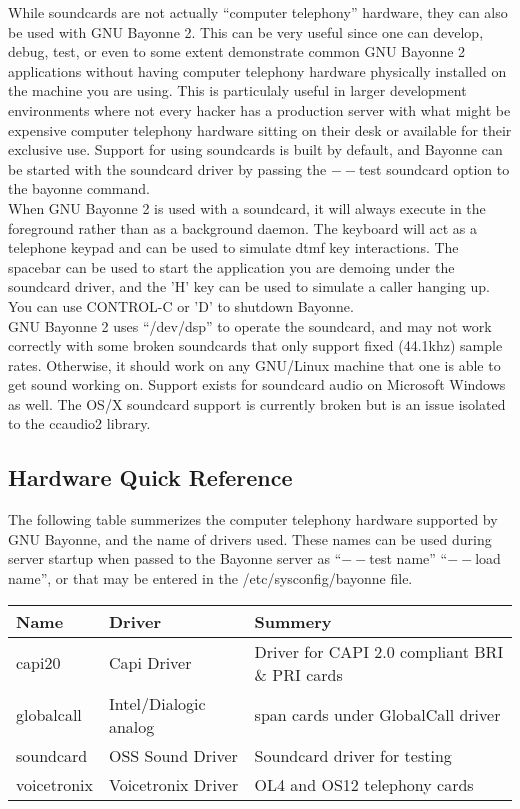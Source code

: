 \documentclass[a4paper,12pt]{article}
\begin{document}
While soundcards are not actually ``computer telephony'' hardware, they
can also be used with GNU Bayonne 2.  This can be very useful since one
can develop, debug, test, or even to some extent demonstrate common GNU
Bayonne 2 applications without having computer telephony hardware
physically installed on the machine you are using.  This is particulaly
useful in larger development environments where not every hacker has a
production server with what might be expensive computer telephony
hardware sitting on their desk or available for their exclusive use. 
Support for using soundcards is built by default, and Bayonne can be
started with the soundcard driver by passing the $--$test soundcard option to
the bayonne command. \\

When GNU Bayonne 2 is used with a soundcard, it will always execute in the
foreground rather than as a background daemon.  The keyboard will act as a
telephone keypad and can be used to simulate dtmf key interactions.  The
spacebar can be used to start the application you are demoing under the
soundcard driver, and the 'H' key can be used to simulate a caller hanging
up.  You can use CONTROL-C or 'D' to shutdown Bayonne. \\

GNU Bayonne 2 uses ``/dev/dsp'' to operate the soundcard, and may not work
correctly with some broken soundcards that only support fixed (44.1khz)
sample rates.  Otherwise, it should work on any GNU/Linux machine that one
is able to get sound working on.  Support exists for soundcard audio on
Microsoft Windows as well.  The OS/X soundcard support is currently
broken but is an issue isolated to the ccaudio2 library.\\

\subsection{Hardware Quick Reference}

The following table summerizes the computer telephony hardware supported
by GNU Bayonne, and the name of drivers used.  These names can be used
during server startup when passed to the Bayonne server as ``$--$test
name'' ``$--$load name'', or that may be entered in the
/etc/sysconfig/bayonne file. \\

\begin{center}
\begin{tabular}{lll} \hline
\bf Name & {\bf Driver} & {\bf Summery} \\ \hline
capi20 & Capi Driver & Driver for CAPI 2.0 compliant BRI \& PRI cards \\
globalcall & Intel/Dialogic analog & span cards under GlobalCall driver \\
soundcard & OSS Sound Driver & Soundcard driver for testing \\
voicetronix & Voicetronix Driver & OL4 and OS12 telephony cards \\
\hline \end{tabular}
\end{center}
\end{document}
